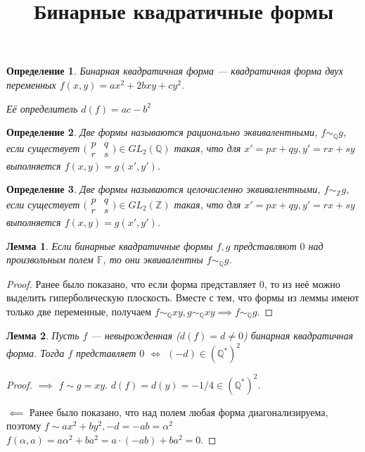 \documentclass[11pt]{article}
\title{Бинарные квадратичные формы}
\date{}
\newtheorem{lemma}{Лемма}
\newtheorem{definition}{Определение}
\newcommand{\F}{\mathbb{F}}
\newcommand{\Z}{\mathbb{Z}}
\newcommand{\Q}{\mathbb{Q}}
\begin{document}
\maketitle

\begin{definition}
    Бинарная квадратичная форма --- квадратичная форма двух переменных $f(x, y) = ax^2 + 2bxy + cy^2$.

    Её определитель $d(f) = ac -b^2$
\end{definition}

\begin{definition}
    Две формы называются рационально эквивалентными, $f \sim_{\Q} g$, если существует 
    $\big(\begin{smallmatrix}
      p & q\\
      r & s
    \end{smallmatrix}\big) \in GL_2(\Q)$
    такая, что для $x' = px+qy, y' = rx+sy$ выполняется $f(x, y) = g(x', y')$.
\end{definition}

\begin{definition}
    Две формы называются целочисленно эквивалентными, $f \sim_{\Z} g$, если существует 
    $\big(\begin{smallmatrix}
      p & q\\
      r & s
    \end{smallmatrix}\big) \in GL_2(\Z)$
    такая, что для $x' = px+qy, y' = rx+sy$ выполняется $f(x, y) = g(x', y')$.
\end{definition}

\begin{lemma}
    Если бинарные квадратичные формы $f, g$ представляют $0$ над произвольным полем $\F$, то они эквивалентны $f \sim_{\Q} g$.
\end{lemma}
\begin{proof}
    Ранее было показано, что если форма представляет $0$, то из неё можно выделить гиперболическую плоскость.
    Вместе с тем, что формы из леммы имеют только две переменные, получаем $f \sim_{\Q} xy, g \sim_{\Q} xy \implies f \sim_{\Q} g$.
\end{proof}

\begin{lemma}
    Пусть $f$ --- невырожденная ($d(f) = d \neq 0$) бинарная квадратичная форма.
    Тогда $f$ представляет $0$ $\iff$ $(-d) \in (\Q^*)^2$
\end{lemma}
\begin{proof}
    $\implies$ $f \sim g = xy$.
    $d(f) = d(y) = -1/4 \in (\Q^*)^2$.

    $\impliedby$ Ранее было показано, что над полем любая форма диагонализируема, поэтому $f \sim ax^2 + by^2, -d = -ab = \alpha^2$
    $f(\alpha, a) = a \alpha^2 + ba^2 = a \cdot (-ab) + ba^2 = 0$.
\end{proof}
\end{document}
